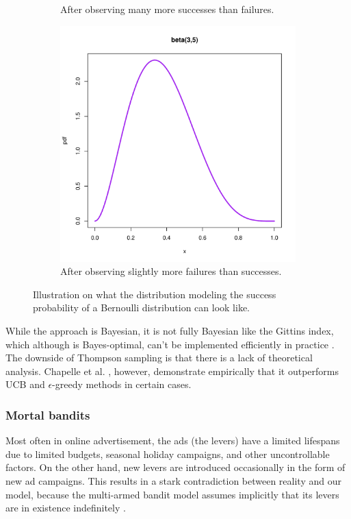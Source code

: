 \documentclass{article} %
\begin{document}
\begin{figure}
\begin{subfigure}{.30\textwidth}
    \caption{After observing many more successes than failures.}
    \label{fig:beta2}
  \end{subfigure}%
  \begin{subfigure}{.30\textwidth}
    \centering
    \includegraphics[width=.9\linewidth]{beta3.pdf}
    \caption{After observing slightly more failures than successes.}
    \label{fig:beta3}
  \end{subfigure}
  \caption{Illustration on what the distribution modeling the success
  probability of a Bernoulli distribution can look like.}
  \label{fig:beta}
\end{figure}



While the approach is Bayesian, it is not fully Bayesian like the Gittins
index, which although is Bayes-optimal, can't be implemented efficiently in
practice \cite{chapelle2011empirical}. The downside of Thompson sampling is
that there is a lack of theoretical analysis. Chapelle et al.
\cite{chapelle2011empirical}, however, demonstrate empirically that it
outperforms UCB and $\epsilon$-greedy methods in certain cases.


\subsubsection{Mortal bandits}
Most often in online advertisement, the ads (the levers) have a limited
lifespans due to limited budgets, seasonal holiday campaigns, and other
uncontrollable factors. On the other hand, new levers are introduced
occasionally in the form of new ad campaigns. This results in a stark
contradiction between reality and our model, because the multi-armed bandit
model assumes implicitly that its levers are in existence indefinitely
\cite{chakrabarti2008mortal}.
\end{document}
